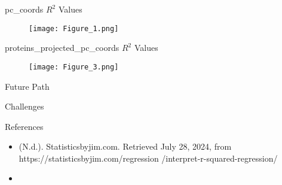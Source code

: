 \documentclass[14pt]{beamer}
\begin{document}
\begin{frame}{pc\_coords $R^2$ Values}
    \begin{figure}
        \centering
        \texttt{[image: Figure\_1.png]}
        \label{fig:enter-label}
    \end{figure}
\end{frame}

\begin{frame}{proteins\_projected\_pc\_coords $R^2$ Values}
    \begin{figure}
        \centering
        \texttt{[image: Figure\_3.png]}
        \label{fig:enter-label}
    \end{figure}
\end{frame}

\begin{frame}{Future Path}
    \begin{fullpageitemize}
        \item\color{colorgreen} \begin{center}\end{center}
        \item\color{colorgreen} \begin{center}\end{center}
        \item\color{colorgreen} \begin{center}\end{center}
    \end{fullpageitemize}
\end{frame}

\begin{frame}{Challenges}
    \begin{fullpageitemize}
        \item\color{colorblue} \begin{center}\end{center}
        \item\color{colorblue} \begin{center}\end{center}
        \item\color{colorblue} \begin{center}\end{center}
    \end{fullpageitemize}
\end{frame}

\begin{frame}{References}
    \begin{itemize}
        \item\color{colorblue}(N.d.). Statisticsbyjim.com. Retrieved July 28, 2024, from https://statisticsbyjim.com/regression
        /interpret-r-squared-regression/
        \item
    \end{itemize}
\end{frame}
\end{document}
